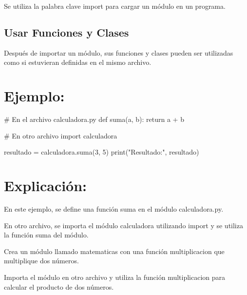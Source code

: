 \documentclass[
  a4paper,
  onepage,
  openany]{scrreprt}
\newenvironment{Shaded}{\begin{snugshade}}{\end{snugshade}}
\newcommand{\BuiltInTok}[1]{\textcolor[rgb]{0.00,0.23,0.31}{#1}}
\newcommand{\CommentTok}[1]{\textcolor[rgb]{0.37,0.37,0.37}{#1}}
\newcommand{\ControlFlowTok}[1]{\textcolor[rgb]{0.00,0.23,0.31}{#1}}
\newcommand{\DecValTok}[1]{\textcolor[rgb]{0.68,0.00,0.00}{#1}}
\newcommand{\ImportTok}[1]{\textcolor[rgb]{0.00,0.46,0.62}{#1}}
\newcommand{\KeywordTok}[1]{\textcolor[rgb]{0.00,0.23,0.31}{#1}}
\newcommand{\NormalTok}[1]{\textcolor[rgb]{0.00,0.23,0.31}{#1}}
\newcommand{\OperatorTok}[1]{\textcolor[rgb]{0.37,0.37,0.37}{#1}}
\newcommand{\StringTok}[1]{\textcolor[rgb]{0.13,0.47,0.30}{#1}}
\begin{document}
Se utiliza la palabra clave import para cargar un módulo en un programa.

\hypertarget{usar-funciones-y-clases-1}{%
\subsection{Usar Funciones y Clases}\label{usar-funciones-y-clases-1}}

Después de importar un módulo, sus funciones y clases pueden ser
utilizadas como si estuvieran definidas en el mismo archivo.

\hypertarget{ejemplo-59}{%
\section{Ejemplo:}\label{ejemplo-59}}

\begin{Shaded}
\begin{Highlighting}[]
\CommentTok{\# En el archivo calculadora.py}
\KeywordTok{def}\NormalTok{ suma(a, b):}
    \ControlFlowTok{return}\NormalTok{ a }\OperatorTok{+}\NormalTok{ b}

\CommentTok{\# En otro archivo}
\ImportTok{import}\NormalTok{ calculadora}

\NormalTok{resultado }\OperatorTok{=}\NormalTok{ calculadora.suma(}\DecValTok{3}\NormalTok{, }\DecValTok{5}\NormalTok{)}
\BuiltInTok{print}\NormalTok{(}\StringTok{"Resultado:"}\NormalTok{, resultado)}
\end{Highlighting}
\end{Shaded}

\hypertarget{explicaciuxf3n-59}{%
\section{Explicación:}\label{explicaciuxf3n-59}}

En este ejemplo, se define una función suma en el módulo calculadora.py.

En otro archivo, se importa el módulo calculadora utilizando import y se
utiliza la función suma del módulo.

\begin{tcolorbox}[enhanced jigsaw, breakable, opacityback=0, toptitle=1mm, coltitle=black, toprule=.15mm, rightrule=.15mm, colframe=quarto-callout-important-color-frame, opacitybacktitle=0.6, arc=.35mm, title=\textcolor{quarto-callout-important-color}{\faExclamation}\hspace{0.5em}{Actividad Práctica:}, titlerule=0mm, colbacktitle=quarto-callout-important-color!10!white, bottomtitle=1mm, bottomrule=.15mm, colback=white, left=2mm, leftrule=.75mm]

Crea un módulo llamado matematicas con una función multiplicacion que
multiplique dos números.

Importa el módulo en otro archivo y utiliza la función multiplicacion
para calcular el producto de dos números.

\end{tcolorbox}
\end{document}
